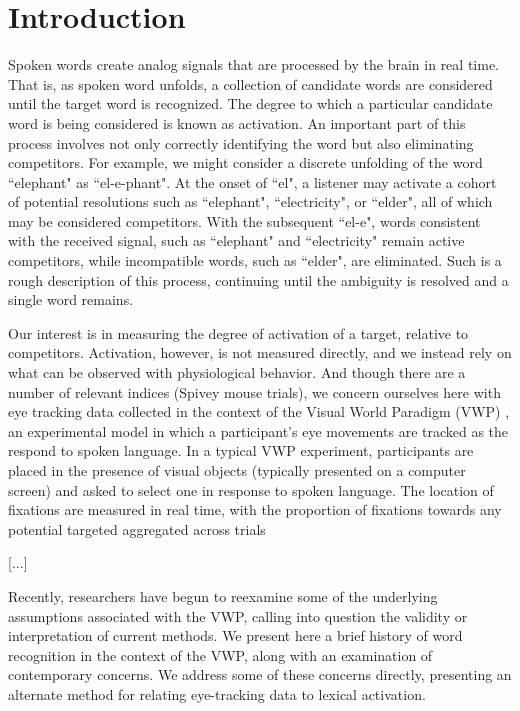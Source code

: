 \section{Introduction}


Spoken words create analog signals that are processed by the brain in real time. That is, as spoken word unfolds, a collection of candidate words are considered until the target word is recognized. The degree to which a particular candidate word is being considered is known as activation. An important part of this process involves not only correctly identifying the word but also eliminating competitors. For example, we might consider a discrete unfolding of the word ``elephant" as ``el-e-phant". At the onset of ``el", a listener may activate a cohort of potential resolutions such as ``elephant", ``electricity", or ``elder", all of which may be considered competitors. With the subsequent ``el-e", words consistent with the received signal, such as ``elephant" and ``electricity" remain active competitors, while incompatible words, such as ``elder", are eliminated. Such is a rough description of this process, continuing until the ambiguity is resolved and a single word remains.




Our interest is in measuring the degree of activation of a target, relative to competitors. Activation, however, is not measured directly, and we instead rely on what can be observed with physiological behavior. And though there are a number of relevant indices (Spivey mouse trials), we concern ourselves here with eye tracking data collected in the context of the Visual World Paradigm (VWP) \cite{tanenhaus1995integration}, an experimental model in which a participant's eye movements are tracked as the respond to spoken language. In a typical VWP experiment, participants are placed in the presence of visual objects (typically presented on a computer screen) and asked to select one in response to spoken language. The location of fixations are measured in real time, with the proportion of fixations towards any potential targeted aggregated across trials

[...]

Recently, researchers have begun to reexamine some of the underlying assumptions associated with the VWP, calling into question the validity or interpretation of current methods. We present here a brief history of word recognition in the context of the VWP, along with an examination of contemporary concerns. We address some of these concerns directly, presenting an alternate method for relating eye-tracking data to lexical activation.



